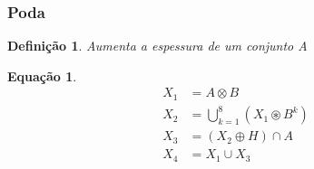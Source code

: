 \documentclass[aspectratio=169]{beamer}
\theoremstyle{Definition}
\newtheorem{defn}{Defini\c c\~ao}
\newtheorem{eq}[theorem]{Equa\c c\~ao}
\begin{document}
\begin{frame}
	\frametitle{Poda}
	
	\begin{defn}
		Aumenta a espessura de um conjunto A
	\end{defn}
	
	\begin{eq}
			\begin{align}
				X_1 &= A \otimes B \\
				X_2 &= \bigcup^8_{k=1} (X_1 \circledast B^k) \\
				X_3 &= (X_2 \oplus H) \cap A \\
				X_4 &= X_1 \cup X_3
		\end{align}
	\end{eq}
	
\end{frame}
\end{document}
